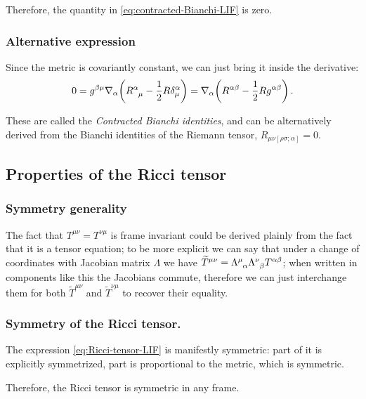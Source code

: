 \documentclass[main.tex]{subfiles}
\begin{document}
Therefore, the quantity in \eqref{eq:contracted-Bianchi-LIF} is zero.

\subsubsection{Alternative expression}

Since the metric is covariantly constant, we can just bring it inside the derivative:
%
\begin{equation}
  0 = g^{\beta \mu }\nabla_{\alpha }\qty(\tensor{R}{^{\alpha }_{\mu }} - \frac{1}{2} R \delta^{\alpha }_{\mu })
  = \nabla_{\alpha }\qty(R^{\alpha \beta } - \frac{1}{2} R g^{\alpha \beta })
\,.
\end{equation}
%

These are called the \emph{Contracted Bianchi identities}, and can be alternatively derived from the Bianchi identities of the Riemann tensor, \(R_{\mu \nu [\rho \sigma ; \alpha ]} = 0\).

\subsection{Properties of the Ricci tensor}

\subsubsection{Symmetry generality}

The fact that \(T^{\mu \nu } = T^{\nu \mu }\) is frame invariant could be derived plainly from the fact that it is a tensor equation; to be more explicit we can say that under a change of coordinates with Jacobian matrix \(\Lambda \) we have \(\widetilde{T}^{\mu \nu } = \tensor{\Lambda }{^{\mu }_{\alpha }} \tensor{\Lambda }{^{\nu }_{\beta }} T^{\alpha \beta }\); when written in components like this the Jacobians commute, therefore we can just interchange them for both \(\widetilde{T}^{\mu \nu }\) and \(\widetilde{T}^{\nu \mu }\) to recover their equality. 

\subsubsection{Symmetry of the Ricci tensor.}

The expression \eqref{eq:Ricci-tensor-LIF} is manifestly symmetric: part of it is explicitly symmetrized, part is proportional to the metric, which is symmetric.

Therefore, the Ricci tensor is symmetric in any frame.
\end{document}
